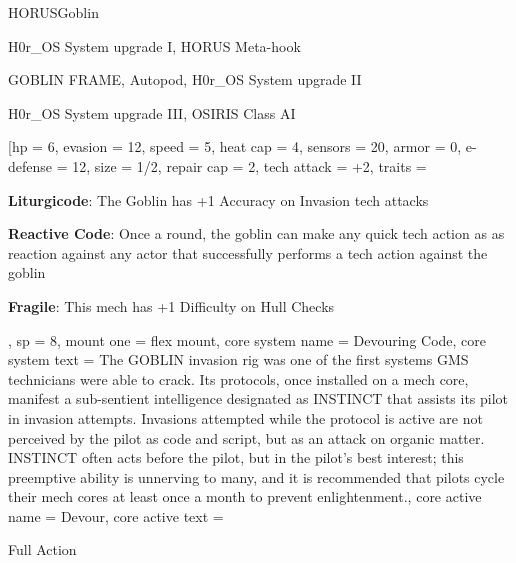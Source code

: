 

\begin{mech}{HORUS}{Goblin}


\begin{license}
\item H0r\_OS System upgrade I, HORUS Meta-hook
\item GOBLIN FRAME, Autopod, H0r\_OS System upgrade II
\item H0r\_OS System upgrade III, OSIRIS Class AI
\end{license}


\frameBox
[hp = 6,
evasion = 12,
speed = 5,
heat cap = 4,
sensors = 20,
armor = 0,
e-defense = 12,
size = 1/2,
repair cap = 2,
tech attack = +2,
traits = {
  \textbf{Liturgicode}: The Goblin has +1 Accuracy on Invasion tech attacks

  \textbf{Reactive Code}: Once a round, the goblin can make any quick tech action as as reaction against any actor that successfully performs a tech action against the goblin

  \textbf{Fragile}: This mech has +1 Difficulty on Hull Checks
  },
sp = 8,
mount one = flex mount,
core system name = Devouring Code,
core system text = {The GOBLIN invasion rig was one of the first systems GMS technicians were able to crack. Its protocols, once installed on a mech core, manifest a sub-sentient intelligence designated as INSTINCT that assists its pilot in invasion attempts. Invasions attempted while the protocol is active are not perceived by the pilot as code and script, but as an attack on organic matter. INSTINCT often acts before the pilot, but in the pilot's best interest; this preemptive ability is unnerving to many, and it is recommended that pilots cycle their mech cores at least once a month to prevent enlightenment.},
core active name = Devour,
core active text = {Full Action

}
\end{mech}
